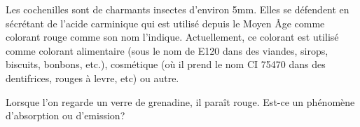 Les cochenilles sont de charmants insectes d'environ 5mm.
Elles se défendent en sécrétant de l'acide carminique qui est utilisé depuis le Moyen Âge comme colorant
rouge comme son nom l'indique.
Actuellement, ce colorant est utilisé comme colorant alimentaire (sous le nom de E120 dans des viandes, sirops, biscuits, bonbons, etc.), cosmétique (où il prend le nom CI 75470 dans des dentifrices, rouges à levre, etc) ou autre.

	      Lorsque l'on regarde un verre de grenadine, il paraît rouge.
		Est-ce un phénomène d'absorption ou d'emission?


